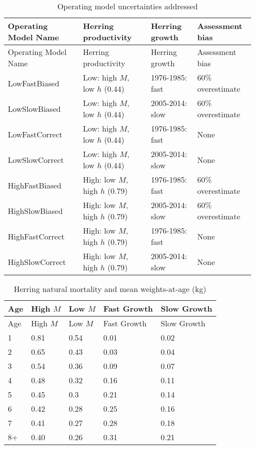 \documentclass[]{article}
\begin{document}
\newpage

\begin{longtable}[]{@{}llll@{}}
\caption{Operating model uncertainties
addressed\label{OMs}}\tabularnewline
\toprule
Operating Model Name & Herring productivity & Herring growth &
Assessment bias\tabularnewline
\midrule
\endfirsthead
\toprule
Operating Model Name & Herring productivity & Herring growth &
Assessment bias\tabularnewline
\midrule
\endhead
LowFastBiased & Low: high \(M\), low \(h\) (0.44) & 1976-1985: fast &
60\% overestimate\tabularnewline
LowSlowBiased & Low: high \(M\), low \(h\) (0.44) & 2005-2014: slow &
60\% overestimate\tabularnewline
LowFastCorrect & Low: high \(M\), low \(h\) (0.44) & 1976-1985: fast &
None\tabularnewline
LowSlowCorrect & Low: high \(M\), low \(h\) (0.44) & 2005-2014: slow &
None\tabularnewline
HighFastBiased & High: low \(M\), high \(h\) (0.79) & 1976-1985: fast &
60\% overestimate\tabularnewline
HighSlowBiased & High: low \(M\), high \(h\) (0.79) & 2005-2014: slow &
60\% overestimate\tabularnewline
HighFastCorrect & High: low \(M\), high \(h\) (0.79) & 1976-1985: fast &
None\tabularnewline
HighSlowCorrect & High: low \(M\), high \(h\) (0.79) & 2005-2014: slow &
None\tabularnewline
\bottomrule
\end{longtable}

\newpage

\begin{longtable}[]{@{}lllll@{}}
\caption{Herring natural mortality and mean weights-at-age (kg)
\label{MWttab}}\tabularnewline
\toprule
Age & High \(M\) & Low \(M\) & Fast Growth & Slow Growth\tabularnewline
\midrule
\endfirsthead
\toprule
Age & High \(M\) & Low \(M\) & Fast Growth & Slow Growth\tabularnewline
\midrule
\endhead
1 & 0.81 & 0.54 & 0.01 & 0.02\tabularnewline
2 & 0.65 & 0.43 & 0.03 & 0.04\tabularnewline
3 & 0.54 & 0.36 & 0.09 & 0.07\tabularnewline
4 & 0.48 & 0.32 & 0.16 & 0.11\tabularnewline
5 & 0.45 & 0.3 & 0.21 & 0.14\tabularnewline
6 & 0.42 & 0.28 & 0.25 & 0.16\tabularnewline
7 & 0.41 & 0.27 & 0.28 & 0.18\tabularnewline
8+ & 0.40 & 0.26 & 0.31 & 0.21\tabularnewline
\bottomrule
\end{longtable}

\newpage
\end{document}
